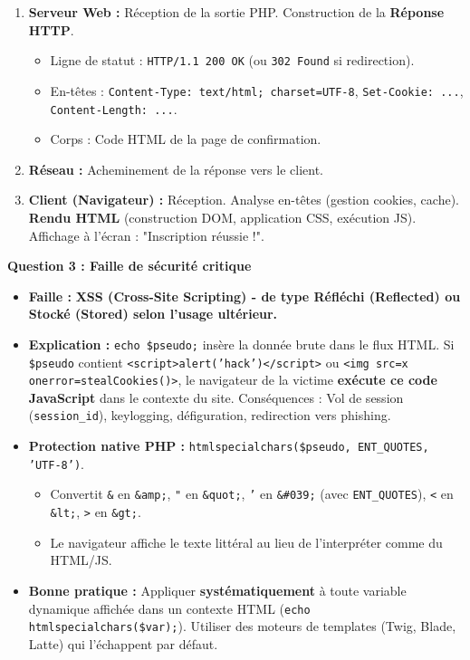 \documentclass[11pt]{article}
\begin{document}
\begin{corrige}
\begin{enumerate}
\begin{itemize}
    \end{itemize}
    \item \textbf{Serveur Web :} Réception de la sortie PHP. Construction de la \textbf{Réponse HTTP}.
    \begin{itemize}
        \item Ligne de statut : \texttt{HTTP/1.1 200 OK} (ou \texttt{302 Found} si redirection).
        \item En-têtes : \texttt{Content-Type: text/html; charset=UTF-8}, \texttt{Set-Cookie: ...}, \texttt{Content-Length: ...}.
        \item Corps : Code HTML de la page de confirmation.
    \end{itemize}
    \item \textbf{Réseau :} Acheminement de la réponse vers le client.
    \item \textbf{Client (Navigateur) :} Réception. Analyse en-têtes (gestion cookies, cache). \textbf{Rendu HTML} (construction DOM, application CSS, exécution JS). Affichage à l'écran : "Inscription réussie !".
\end{enumerate}

\textbf{Question 3 : Faille de sécurité critique}

\begin{itemize}
    \item \textbf{Faille :} \textbf{XSS (Cross-Site Scripting) - de type Réfléchi (Reflected) ou Stocké (Stored) selon l'usage ultérieur.}
    \item \textbf{Explication :} \texttt{echo \$pseudo;} insère la donnée brute dans le flux HTML. Si \texttt{\$pseudo} contient \texttt{<script>alert('hack')</script>} ou \texttt{<img src=x onerror=stealCookies()>}, le navigateur de la victime \textbf{exécute ce code JavaScript} dans le contexte du site. Conséquences : Vol de session (\texttt{session\_id}), keylogging, défiguration, redirection vers phishing.
    \item \textbf{Protection native PHP :} \texttt{htmlspecialchars(\$pseudo, ENT\_QUOTES, 'UTF-8')}.
    \begin{itemize}
        \item Convertit \texttt{\&} en \texttt{\&amp;}, \texttt{"} en \texttt{\&quot;}, \texttt{'} en \texttt{\&\#039;} (avec \texttt{ENT\_QUOTES}), \texttt{<} en \texttt{\&lt;}, \texttt{>} en \texttt{\&gt;}.
        \item Le navigateur affiche le texte littéral au lieu de l'interpréter comme du HTML/JS.
    \end{itemize}
    \item \textbf{Bonne pratique :} Appliquer \textbf{systématiquement} à toute variable dynamique affichée dans un contexte HTML (\texttt{echo htmlspecialchars(\$var);}). Utiliser des moteurs de templates (Twig, Blade, Latte) qui l'échappent par défaut.
\end{itemize}


\end{corrige}
\end{document}
